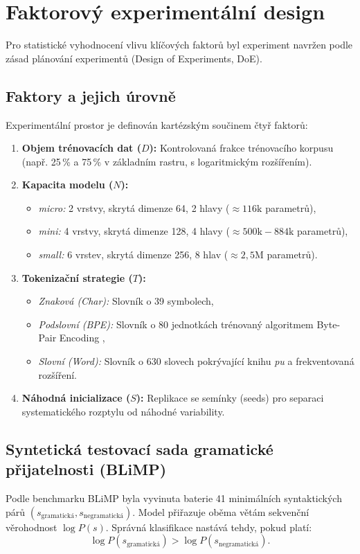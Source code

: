 \chapter{Faktorový experimentální design}
\label{chap:pokus}

Pro statistické vyhodnocení vlivu klíčových faktorů byl experiment navržen podle zásad plánování experimentů (Design of Experiments, DoE).

\section{Faktory a jejich úrovně}
Experimentální prostor je definován kartézským součinem čtyř faktorů:
\begin{enumerate}
    \item \textbf{Objem trénovacích dat ($D$):} Kontrolovaná frakce trénovacího korpusu (např. 25\,\% a 75\,\% v základním rastru, s logaritmickým rozšířením).
    \item \textbf{Kapacita modelu ($N$):}
    \begin{itemize}
        \item \textit{micro:} 2 vrstvy, skrytá dimenze 64, 2 hlavy ($\approx 116\text{k}$ parametrů),
        \item \textit{mini:} 4 vrstvy, skrytá dimenze 128, 4 hlavy ($\approx 500\text{k} - 884\text{k}$ parametrů),
        \item \textit{small:} 6 vrstev, skrytá dimenze 256, 8 hlav ($\approx 2{,}5\text{M}$ parametrů).
    \end{itemize}
    \item \textbf{Tokenizační strategie ($T$):}
    \begin{itemize}
        \item \textit{Znaková (Char):} Slovník o 39 symbolech,
        \item \textit{Podslovní (BPE):} Slovník o 80 jednotkách trénovaný algoritmem Byte-Pair Encoding \cite{sennrich2016neural},
        \item \textit{Slovní (Word):} Slovník o 630 slovech pokrývající knihu \textit{pu} a frekventovaná rozšíření.
    \end{itemize}
    \item \textbf{Náhodná inicializace ($S$):} Replikace se semínky (seeds) pro separaci systematického rozptylu od náhodné variability.
\end{enumerate}

\section{Syntetická testovací sada gramatické přijatelnosti (BLiMP)}
Podle benchmarku BLiMP \cite{warstadt2020blimp} byla vyvinuta baterie 41 minimálních syntaktických párů $(s_{\text{gramatická}}, s_{\text{negramatická}})$. Model přiřazuje oběma větám sekvenční věrohodnost $\log P(s)$. Správná klasifikace nastává tehdy, pokud platí:
\begin{equation}
    \log P(s_{\text{gramatická}}) > \log P(s_{\text{negramatická}}).
\end{equation}

